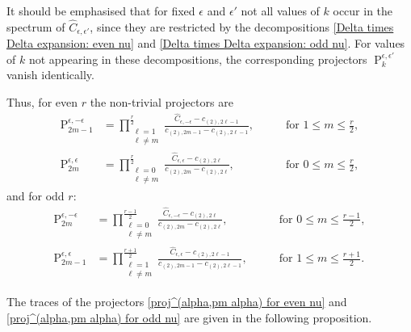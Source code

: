 \documentclass[a4paper]{article}
\newcommand{\hC}{\widehat{C}}
\renewcommand{\=}{\ =\ }
\DeclareMathOperator{\proj}{P}
\numberwithin{equation}{section}
\theoremstyle{remark}
\begin{document}
It should be emphasised that for fixed $\epsilon$ and $\epsilon'$
not all values of $k$ occur in the spectrum of $\hC_{\epsilon,\epsilon'}$,
since they are restricted by the decompositions
\eqref{Delta times Delta expansion: even nu}
and
\eqref{Delta times Delta expansion: odd nu}.
For values of $k$ not appearing in these decompositions,
the corresponding projectors
$\proj_k^{\epsilon,\epsilon'}$
vanish identically.

Thus, for even $r$ the non-trivial projectors are
\begin{equation}\label{proj^(alpha,pm alpha) for even nu}
\begin{aligned}
\proj_{2m-1}^{\epsilon,-\epsilon}&=\prod_{\substack{\ell=1\\ \ell\neq m}}^{\frac{r}{2}}\frac{\hC_{\epsilon,-\epsilon}-c_{(2),2\ell-1}}{c_{(2),2m-1}-c_{(2),2\ell-1}},\qquad &\text{for } 1\le m\le \frac{r}{2},\\
\proj_{2m}^{\epsilon,\epsilon}&=\prod_{\substack{\ell=0\\ \ell\neq m}}^{\frac{r}{2}}\frac{\hC_{\epsilon,\epsilon}-c_{(2),2\ell}}{c_{(2),2m}-c_{(2),2\ell}},\qquad &\text{for } 0\le m\le \frac{r}{2},
\end{aligned}
\end{equation}
and for odd $r$:
\begin{equation}\label{proj^(alpha,pm alpha) for odd nu}
\begin{aligned}
\proj_{2m}^{\epsilon,-\epsilon}&=\prod_{\substack{\ell=0\\ \ell\neq m}}^{\frac{r-1}{2}}\frac{\hC_{\epsilon,-\epsilon}-c_{(2),2\ell}}{c_{(2),2m}-c_{(2),2\ell}},\qquad &\text{for } 0\le m\le \frac{r-1}{2},\\
\proj_{2m-1}^{\epsilon,\epsilon}&=\prod_{\substack{\ell=1\\ \ell\neq m}}^{\frac{r+1}{2}}\frac{\hC_{\epsilon,\epsilon}-c_{(2),2\ell-1}}{c_{(2),2m-1}-c_{(2),2\ell-1}},\qquad &\text{for } 1\le m\le \frac{r+1}{2}.
\end{aligned}
\end{equation}

The traces of the projectors \eqref{proj^(alpha,pm alpha) for even nu} and \eqref{proj^(alpha,pm alpha) for odd nu} are given in the following proposition.
\end{document}
